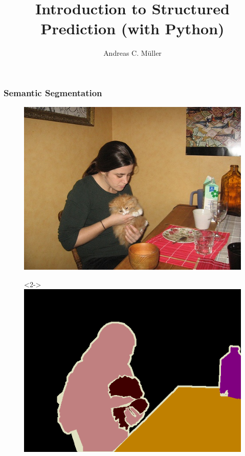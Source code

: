 \documentclass[final,ignorenonframetext,compress]{beamer}
\title[Stuctured Prediction] 
{Introduction to Structured Prediction (with Python)}
\author%
{Andreas C. M\"uller}
\institute[] %
{%
    Columbia University
}
\begin{document}
\begin{frame}
    \titlepage
\end{frame}

\begin{frame}
    \tableofcontents
\end{frame}

\begin{frame}
    \frametitle{Semantic Segmentation}
        \begin{figure}
            \includegraphics[width=.4 \textwidth]{images/pascal}
            \begin{visibleenv}<2->
                \includegraphics[width=.4 \textwidth]{images/pascal_gt}
            \end{visibleenv}
        \end{figure}
\end{frame}
\end{document}
